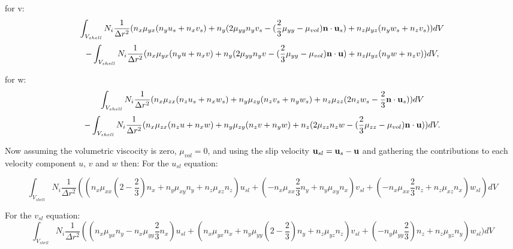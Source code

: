 for v:
\begin{equation}
\int_{V_{shell}} 
N_i\frac{1}{\Delta r^2}
({n_x} \mu_{yx}
(n_y u_s + n_x v_s) 
+
{n_y}(2\mu_{yy}
n_y v_s 
-(\frac{2}{3}\mu_{yy}-\mu_{vol}) {\bf n} \cdot{\bf u}_s 
)
+
{n_z} \mu_{yz}
(n_y w_s + n_z v_s )
 )dV
\label{visc-stress-v-n-2-solid} 
\end{equation}
\begin{equation}
-  \int_{V_{shell}} 
N_i \frac{1}{\Delta r^2}
({n_x} \mu_{yx}
(n_y u + n_x v) 
+
{n_y}(2\mu_{yy}
n_y v 
-(\frac{2}{3}\mu_{yy}-\mu_{vol}) {\bf n} \cdot{\bf u}
)
+
{n_z} \mu_{yz}
(n_y w + n_z v )
 )d V,
\label{visc-stress-v-n-2-fluid} 
\end{equation}


for w:
\begin{equation}
\int_{V_{shell}} 
N_i \frac{1}{\Delta r^2}
({n_x} \mu_{zx}
( n_z u_s + n_x w_s )
+
{n_y} \mu_{zy}
( n_z v_s + n_y w_s )
+
{n_z} \mu_{zz}
(
2 n_z w_s 
-\frac{2}{3} {\bf n} \cdot{\bf u}_s 
) )d V 
\label{visc-stress-w-n-2-solid} 
\end{equation}
\begin{equation}
-\int_{V_{shell}} 
N_i \frac{1}{\Delta r^2}
({n_x} \mu_{zx}
( n_z u + n_x w )
+
{n_y} \mu_{zy}
( n_z v + n_y w )
+
{n_z} (2\mu_{zz}
n_z w 
-(\frac{2}{3}\mu_{zz}-\mu_{vol}) {\bf n} \cdot{\bf u}
) )d V. 
\label{visc-stress-w-n-2-fluid} 
\end{equation}

Now assuming the volumetric viscocity is zero, $\mu_{vol}=0$, 
and using the slip velocity ${\bf u}_{sl} = {\bf u}_{s} -{\bf u}$ and gathering the 
contributions to each velocity component $u$, $v$ and $w$ then: 
For the $u_{sl}$ equation:

\begin{equation}
\int_{V_{shell}} 
N_i \frac{1}{\Delta r^2} 
(
({n_x} \mu_{xx}
(2-\frac{2}{3}) n_x +n_y \mu_{xy} n_y + n_z\mu_{xz} n_z) u_{sl} 
+
(-n_x \mu_{xx}\frac{2}{3} n_y + n_y \mu_{xy} n_x
)v_{sl} 
+
(-n_x \mu_{xx}\frac{2}{3} n_z + n_z \mu_{xz} n_x
)w_{sl} 
 )d V
\label{visc-stress-u-n-2-sl} 
\end{equation}

For the $v_{sl}$ equation:
\begin{equation}
\int_{V_{shell}} 
N_i \frac{1}{\Delta r^2} 
(
({n_x} \mu_{yx} n_y -n_x\mu_{yy}\frac{2}{3} n_x ) u_{sl} 
+
(n_x \mu_{yx}n_x + n_y\mu_{yy} (2-\frac{2}{3}) n_y + n_z\mu_{yz} n_z) v_{sl} 
+
( - n_y\mu_{yy} \frac{2}{3}) n_z + n_z\mu_{yz} n_y
)w_{sl} 
 )d V
\label{visc-stress-v-n-2-sl} 
\end{equation}



